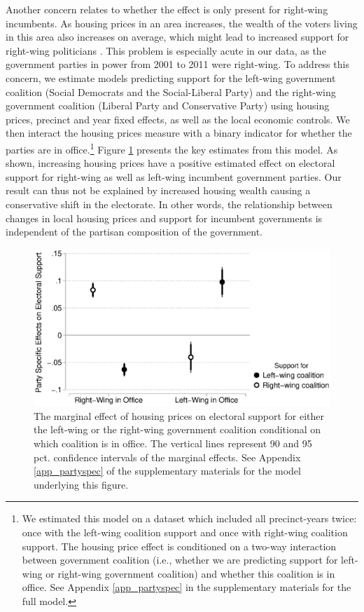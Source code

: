 \documentclass[12pt,a4paper]{article}
\begin{document}
	Another concern relates to whether the effect is only present for right-wing incumbents. As housing prices in an area increases, the wealth of the voters living in this area also increases on average, which might lead to increased support for right-wing politicians \cite{ansell2014political}. This problem is especially acute in our data, as the government parties in power from 2001 to 2011 were right-wing. To address this concern, we estimate models predicting support for the left-wing government coalition (Social Democrats and the Social-Liberal Party) and the right-wing government coalition (Liberal Party and Conservative Party) using housing prices, precinct and year fixed effects, as well as the local economic controls. We then interact the housing prices measure with a binary indicator for whether the parties are in office.\footnote{We estimated this model on a dataset which included all precinct-years twice: once with the left-wing coalition support and once with right-wing coalition support. The housing price effect is conditioned on a two-way interaction between government coalition (i.e., whether we are predicting support for left-wing or right-wing government coalition) and whether this coalition is in office. See Appendix \ref{app_partyspec} in the supplementary materials for the full model.} Figure \ref{partyspecific} presents the key estimates from this model. As shown, increasing housing prices have a positive estimated effect on electoral support for right-wing as well as left-wing incumbent government parties. Our result can thus not be explained by increased housing wealth causing a conservative shift in the electorate. In other words, the relationship between changes in local housing prices and support for incumbent governments is independent of the partisan composition of the government.
	
	\begin{figure}
		\includegraphics[width=1\textwidth]{../figures/partyspecific.eps}
		\caption{The marginal effect of housing prices on electoral support for either the left-wing or the right-wing government coalition conditional on which coalition is in office.  The vertical lines represent 90 and 95 pct. confidence intervals of the marginal effects. See Appendix \ref{app_partyspec} of the supplementary materials for the model underlying this figure.}
		\label {partyspecific}
	\end{figure}
	
\end{document}
